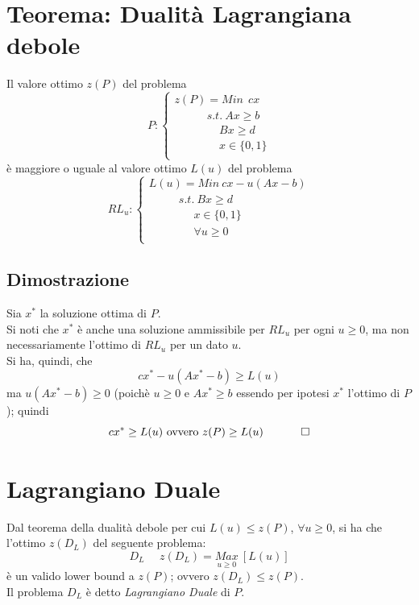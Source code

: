 \section{Teorema: Dualità Lagrangiana debole}
Il valore ottimo $z(P)$ del problema
\begin{displaymath}
P:
\begin{cases}
z(P)=Min\ \ cx \\
\ \ \ \ \ \ \ \ \ \ \ \ \ s.t.\ Ax\ge b \\
\ \ \ \ \ \ \ \ \ \ \ \ \ \ \ \ \ \ Bx\ge d \\
\ \ \ \ \ \ \ \ \ \ \ \ \ \ \ \ \ \ x\in \{0,1\} \\
\end{cases}
\end{displaymath}
è maggiore o uguale al valore ottimo $L(u)$ del problema
\begin{displaymath}
RL_{u}:
\begin{cases}
L(u)=Min\ cx-u(Ax-b) \\
\ \ \ \ \ \ \ \ \ \ \ \ s.t.\ Bx\ge d \\
\ \ \ \ \ \ \ \ \ \ \ \ \ \ \ \ \ \ x\in \{0,1\} \\
\ \ \ \ \ \ \ \ \ \ \ \ \ \ \ \ \ \ \forall u\ge 0 \\
\end{cases}
\end{displaymath}
\subsection{Dimostrazione}
Sia $x^{*}$ la soluzione ottima di $P$.\\
Si noti che $x^{*}$ è anche una soluzione ammissibile per $RL_{u}$ per ogni $u\ge 0$, ma non necessariamente l'ottimo di $RL_{u}$ per un dato $u$.\\
Si ha, quindi, che
\begin{equation*}
	cx^{*}-u(Ax^{*}-b)\ge L(u)
\end{equation*}
ma $u(Ax^{*}-b)\ge 0$ (poichè $u\ge 0$ e $Ax^{*}\ge b$ essendo per ipotesi $x^{*}$ l'ottimo di $P$); quindi
\begin{equation*}
	cx^{*}\ge L(u)\textnormal{ ovvero }z(P)\ge L(u)\ \ \ \ \ \ \ \ \ \ \square
\end{equation*}

\section{Lagrangiano Duale}
Dal teorema della dualità debole per cui $L(u)\le z(P)$, $\forall u\ge 0$, si ha che l'ottimo $z(D_{L})$ del seguente problema:
\begin{equation*}
	D_{L}\ \ \ \ \ \ z(D_{L})=\underset{u\ge 0}{Max}\ [L(u)]
\end{equation*}
è un valido lower bound a $z(P)$; ovvero $z(D_{L})\le z(P)$.\\
Il problema $D_{L}$ è detto \textit{Lagrangiano Duale} di $P$.

